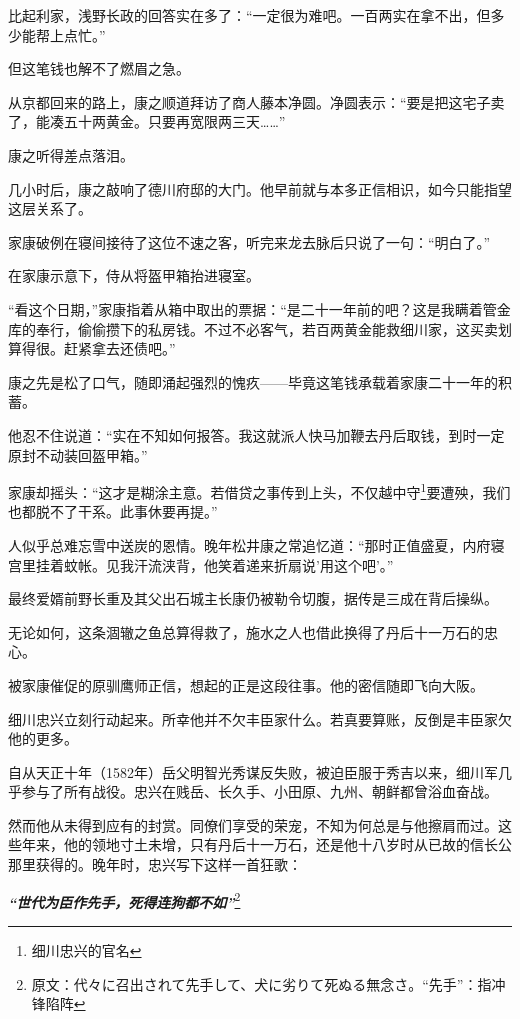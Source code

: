 \documentclass[
]{article}
\begin{document}
比起利家，浅野长政的回答实在多了：``一定很为难吧。一百两实在拿不出，但多少能帮上点忙。''

但这笔钱也解不了燃眉之急。

从京都回来的路上，康之顺道拜访了商人藤本净圆。净圆表示：``要是把这宅子卖了，能凑五十两黄金。只要再宽限两三天\ldots\ldots{}''

康之听得差点落泪。

几小时后，康之敲响了德川府邸的大门。他早前就与本多正信相识，如今只能指望这层关系了。

家康破例在寝间接待了这位不速之客，听完来龙去脉后只说了一句：``明白了。''

在家康示意下，侍从将盔甲箱抬进寝室。

``看这个日期，''家康指着从箱中取出的票据：``是二十一年前的吧？这是我瞒着管金库的奉行，偷偷攒下的私房钱。不过不必客气，若百两黄金能救细川家，这买卖划算得很。赶紧拿去还债吧。''

康之先是松了口气，随即涌起强烈的愧疚------毕竟这笔钱承载着家康二十一年的积蓄。

他忍不住说道：``实在不知如何报答。我这就派人快马加鞭去丹后取钱，到时一定原封不动装回盔甲箱。''

家康却摇头：``这才是糊涂主意。若借贷之事传到上头，不仅越中守\footnote{细川忠兴的官名}要遭殃，我们也都脱不了干系。此事休要再提。''

人似乎总难忘雪中送炭的恩情。晚年松井康之常追忆道：``那时正值盛夏，内府寝宫里挂着蚊帐。见我汗流浃背，他笑着递来折扇说'用这个吧'。''

最终爱婿前野长重及其父出石城主长康仍被勒令切腹，据传是三成在背后操纵。

无论如何，这条涸辙之鱼总算得救了，施水之人也借此换得了丹后十一万石的忠心。

被家康催促的原驯鹰师正信，想起的正是这段往事。他的密信随即飞向大阪。

细川忠兴立刻行动起来。所幸他并不欠丰臣家什么。若真要算账，反倒是丰臣家欠他的更多。

自从天正十年（1582年）岳父明智光秀谋反失败，被迫臣服于秀吉以来，细川军几乎参与了所有战役。忠兴在贱岳、长久手、小田原、九州、朝鲜都曾浴血奋战。

然而他从未得到应有的封赏。同僚们享受的荣宠，不知为何总是与他擦肩而过。这些年来，他的领地寸土未增，只有丹后十一万石，还是他十八岁时从已故的信长公那里获得的。晚年时，忠兴写下这样一首狂歌：

\textbf{\emph{``世代为臣作先手，死得连狗都不如''}}\footnote{原文：代々に召出されて先手して、犬に劣りて死ぬる無念さ。``先手''：指冲锋陷阵}
\end{document}
